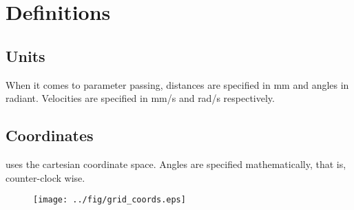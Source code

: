 \chapter{Definitions}


\section{Units}

When it comes to parameter passing, distances are specified in mm and
angles in radiant. Velocities are specified in mm/s and rad/s
respectively. 

\section{Coordinates}

\miro uses the cartesian coordinate space. Angles are specified
mathematically, that is, counter-clock wise.



\begin{figure}[!ht]
  \begin{center}
    \texttt{[image: ../fig/grid\_coords.eps]}
  \end{center}
\end{figure}


